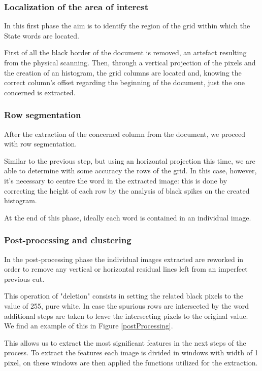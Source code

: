 \subsubsection{Localization of the area of interest}

In this first phase the aim is to identify the region of the grid within which the State words are located. 

First of all the black border of the document is removed, an artefact resulting from the physical scanning. Then, through a vertical projection of the pixels and the creation of an histogram, the grid columns are located and, knowing the correct column's offset regarding the beginning of the document, just the one concerned is extracted.

\subsubsection{Row segmentation}

After the extraction of the concerned column from the document, we proceed with row segmentation.

Similar to the previous step, but using an horizontal projection this time, we are able to determine with some accuracy the rows of the grid. In this case, however, it's necessary to centre the word in the extracted image: this is done by correcting the height of each row by the analysis of black spikes on the created histogram.

At the end of this phase, ideally each word is contained in an individual image.

\subsubsection{Post-processing and clustering}
\label{oldFeatures}
In the post-processing phase the individual images extracted are reworked in order to remove any  vertical or horizontal residual lines left from an imperfect previous cut.

This operation of "deletion" consists in setting the related black pixels to the value of 255, pure white.
In case the spurious rows are intersected by the word additional steps are taken to leave the intersecting pixels to the original value. We find an example of this in Figure \ref{postProcessing}.

This allows us to extract the most significant features in the next steps of the process.
To extract the features each image is divided in windows with width of 1 pixel, on these windows are then applied the functions utilized for the extraction.

